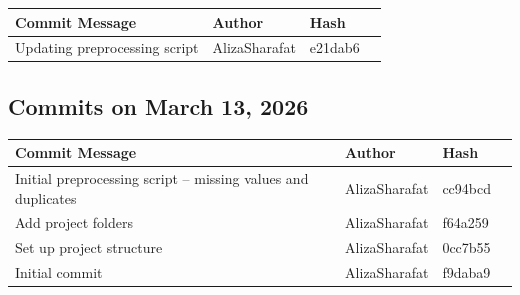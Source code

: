 \documentclass[12pt, a4paper]{article}
\begin{document}
\begin{table}[H]
\centering
\small
\begin{tabular}{llll}
\toprule
\textbf{Commit Message} & \textbf{Author} & \textbf{Hash} \\
\midrule
Updating preprocessing script & AlizaSharafat & e21dab6 \\
\bottomrule
\end{tabular}
\end{table}

\subsection*{Commits on March 13, 2026}

\begin{table}[H]
\centering
\small
\begin{tabular}{llll}
\toprule
\textbf{Commit Message} & \textbf{Author} & \textbf{Hash} \\
\midrule
Initial preprocessing script -- missing values and duplicates & AlizaSharafat & cc94bcd \\
Add project folders & AlizaSharafat & f64a259 \\
Set up project structure & AlizaSharafat & 0cc7b55 \\
Initial commit & AlizaSharafat & f9daba9 \\
\bottomrule
\end{tabular}
\end{table}
\end{document}
